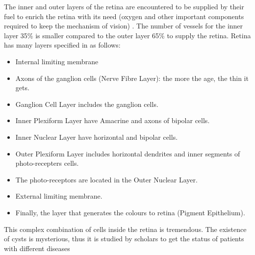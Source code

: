 The inner and outer layers of the retina  are encountered to be supplied by their fuel to enrich the retina with its need (oxygen and other important components required to keep the mechanism of vision) \cite{jonas1992count}.
The number of vessels for the inner layer 35\% is smaller compared to the outer layer 65\% to supply the retina.
Retina has many layers specified in \cite{abramoff2010retinal} as follows:
\begin{itemize}
\item Internal limiting membrane
\item Axons of the ganglion cells (Nerve Fibre Layer): the more the age, the thin it gets.
\item Ganglion Cell Layer includes the ganglion cells.
\item Inner Plexiform Layer have Amacrine and axons of bipolar cells.
\item Inner Nuclear Layer have horizontal and bipolar cells.
\item Outer Plexiform Layer includes horizontal dendrites and inner segments of photo-recepters cells.
\item The photo-receptors are located in the Outer Nuclear Layer.
\item External limiting membrane.
\item Finally, the layer that generates the colours to retina (Pigment Epithelium).
\end{itemize}
This complex combination of cells inside the retina is tremendous.
The existence of cysts is mysterious, thus it is studied by scholars to get the status of patients with different diseases \cite{jakobs2005retinal}

